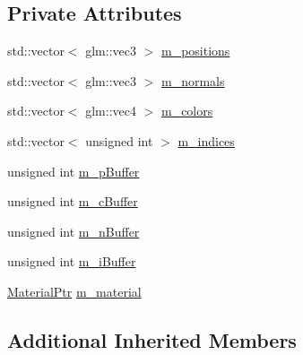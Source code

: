 \subsection*{Private Attributes}
\begin{DoxyCompactItemize}
\item 
std\+::vector$<$ glm\+::vec3 $>$ \hyperlink{classLightedMeshRenderable_acc09c83711ed52719dce8ecb21402b73}{m\+\_\+positions}
\item 
std\+::vector$<$ glm\+::vec3 $>$ \hyperlink{classLightedMeshRenderable_a37b64e7bf9a9062aaad0aac05f04714c}{m\+\_\+normals}
\item 
std\+::vector$<$ glm\+::vec4 $>$ \hyperlink{classLightedMeshRenderable_ac22bb908efafa4720767615e7eab7bf9}{m\+\_\+colors}
\item 
std\+::vector$<$ unsigned int $>$ \hyperlink{classLightedMeshRenderable_af2bb140e6238e4740cb2b59efb431801}{m\+\_\+indices}
\item 
unsigned int \hyperlink{classLightedMeshRenderable_a1617b5e5bfddb4395ca27ab80271c915}{m\+\_\+p\+Buffer}
\item 
unsigned int \hyperlink{classLightedMeshRenderable_afd73d691c525f8b5d7f93aa65561f928}{m\+\_\+c\+Buffer}
\item 
unsigned int \hyperlink{classLightedMeshRenderable_a86a21c313ce8b7d1fff4bfbc7d60bfce}{m\+\_\+n\+Buffer}
\item 
unsigned int \hyperlink{classLightedMeshRenderable_adc7552281a74337733996a2812fe1fa6}{m\+\_\+i\+Buffer}
\item 
\hyperlink{Material_8hpp_a1d47cd05ca683e287435cf0b363fbfe1}{Material\+Ptr} \hyperlink{classLightedMeshRenderable_abfe2d1ed84db96d131d681c55671584b}{m\+\_\+material}
\end{DoxyCompactItemize}
\subsection*{Additional Inherited Members}


